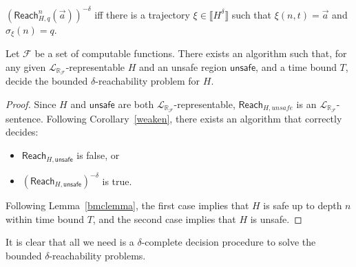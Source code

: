 \documentclass[envcountsect]{llncs}
\newcommand{\reach}{\mathsf{Reach}}
\newcommand{\unsafe}{\mathsf{unsafe}}
\newcommand{\lrf}{\mathcal{L}_{\mathbb{R}_{\mathcal{F}}}}
\begin{document}
\begin{proposition}\label{equiv-delta}
$(\reach_{H,q}^n(\vec a))^{-\delta}$ iff there is a trajectory $\xi\in
\llbracket H^{\delta}\rrbracket$ such that $\xi(n, t) = \vec a$ and
$\sigma_{\xi}(n) = q$.  
\end{proposition}




\begin{theorem}
Let $\mathcal{F}$ be a set of computable functions. There exists an algorithm such that, for any given $\lrf$-representable $H$ and an unsafe region $\unsafe$, and a time bound $T$, decide the bounded $\delta$-reachability problem for $H$.  
\end{theorem}

\begin{proof}
Since $H$ and $\unsafe$ are both $\lrf$-representable, $\reach_{H,unsafe}$ is an $\lrf$-sentence. Following Corollary~\ref{weaken}, there exists an algorithm that correctly decides:
\begin{itemize}
\item $\reach_{H,\unsafe}$ is false, or
\item $(\reach_{H,\unsafe})^{-\delta}$ is true. 
\end{itemize}
Following Lemma~\ref{bmclemma}, the first case implies that $H$ is safe up to depth $n$ within time bound $T$, and the second case implies that $H$ is unsafe. 
\end{proof}

It is clear that all we need is a $\delta$-complete decision procedure to solve the bounded $\delta$-reachability problems. 
\end{document}
